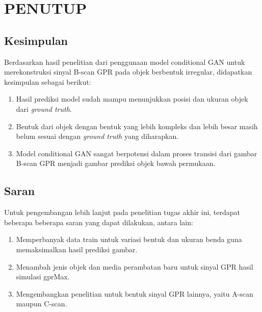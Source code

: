 \chapter{PENUTUP}
\label{chap:penutup}


\section{Kesimpulan}
\label{sec:kesimpulan}

Berdasarkan hasil penelitian dari penggunaan model conditional GAN untuk merekonstruksi sinyal B-scan GPR pada objek berbentuk irregular, didapatkan kesimpulan sebagai berikut:

\begin{enumerate}[nolistsep]

  \item Hasil prediksi model sudah mampu menunjukkan posisi dan ukuran objek dari \emph{ground truth}.

  \item Bentuk dari objek dengan bentuk yang lebih kompleks dan lebih besar masih belum sesuai dengan \emph{ground truth} yang diharapkan. 

  \item Model conditional GAN sangat berpotensi dalam proses transisi dari gambar B-scan GPR menjadi gambar prediksi objek bawah permukaan.

\end{enumerate}

\section{Saran}
\label{chap:saran}

Untuk pengembangan lebih lanjut pada penelitian tugas akhir ini, terdapat beberapa beberapa saran yang dapat dilakukan, antara lain:

\begin{enumerate}[nolistsep]

  \item Memperbanyak data train untuk variasi bentuk dan ukuran benda guna memaksimalkan hasil prediksi gambar.

  \item Menambah jenis objek dan media perambatan baru untuk sinyal GPR hasil simulasi gprMax.

  \item Mengembangkan penelitian untuk bentuk sinyal GPR lainnya, yaitu A-scan maupun C-scan.

\end{enumerate}
